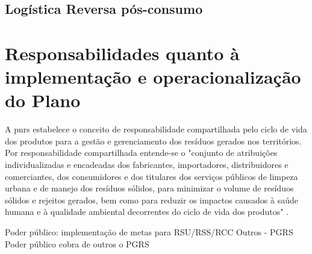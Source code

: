 \subsection{Logística Reversa pós-consumo}



\section{Responsabilidades quanto à implementação e operacionalização do Plano}



A \gls{pnrs} estabelece o conceito de responsabilidade compartilhada pelo ciclo de vida dos produtos para a gestão e gerenciamento dos resíduos gerados nos territórios. Por responsabilidade compartilhada entende-se o "conjunto de atribuições individualizadas e encadeadas dos fabricantes, importadores, distribuidores e comerciantes, dos consumidores e dos titulares dos serviços públicos de limpeza urbana e de manejo dos resíduos sólidos, para minimizar o volume de resíduos sólidos e rejeitos gerados, bem como para reduzir os impactos causados à saúde humana e à qualidade ambiental decorrentes do ciclo de vida dos produtos" \cite{brasil:12305}.

Poder público: implementação de metas para RSU/RSS/RCC
Outros - PGRS
Poder público cobra de outros o PGRS




